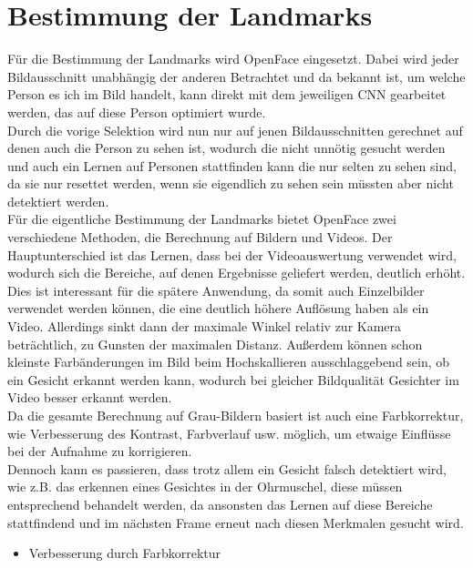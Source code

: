 \section{Bestimmung der Landmarks}
\label{bestimmung_Landmarks}
Für die Bestimmung der Landmarks wird OpenFace eingesetzt. Dabei wird jeder Bildausschnitt unabhängig der anderen Betrachtet und da bekannt ist, um welche Person es ich im Bild handelt, kann direkt mit dem jeweiligen CNN gearbeitet werden, das auf diese Person optimiert wurde.\\
Durch die vorige Selektion wird nun nur auf jenen Bildausschnitten gerechnet auf denen auch die Person zu sehen ist, wodurch die nicht unnötig gesucht werden und auch ein Lernen auf Personen stattfinden kann die nur selten zu sehen sind, da sie nur resettet werden, wenn sie eigendlich zu sehen sein müssten aber nicht detektiert werden.\\
Für die eigentliche Bestimmung der Landmarks bietet OpenFace zwei verschiedene Methoden, die Berechnung auf Bildern und Videos. Der Hauptunterschied ist das Lernen, dass bei der Videoauswertung verwendet wird, wodurch sich die Bereiche, auf denen Ergebnisse geliefert werden, deutlich erhöht.\\
Dies ist interessant für die spätere Anwendung, da somit auch Einzelbilder verwendet werden können, die eine deutlich höhere Auflösung haben als ein Video. Allerdings sinkt dann der maximale Winkel relativ zur Kamera beträchtlich, zu Gunsten der maximalen Distanz. Außerdem können schon kleinste Farbänderungen im Bild beim Hochskallieren ausschlaggebend sein, ob ein Gesicht erkannt werden kann, wodurch bei gleicher Bildqualität Gesichter im Video besser erkannt werden.\\
Da die gesamte Berechnung auf Grau-Bildern basiert ist auch eine Farbkorrektur, wie Verbesserung des Kontrast, Farbverlauf usw. möglich, um etwaige Einflüsse bei der Aufnahme zu korrigieren.\\
Dennoch kann es passieren, dass trotz allem  ein Gesicht falsch detektiert wird, wie z.B. das erkennen eines Gesichtes in der Ohrmuschel, diese müssen entsprechend behandelt werden, da ansonsten das Lernen auf diese Bereiche stattfindend und im nächsten Frame erneut nach diesen Merkmalen gesucht wird.

\begin{itemize}
\item Verbesserung durch Farbkorrektur
\end{itemize}